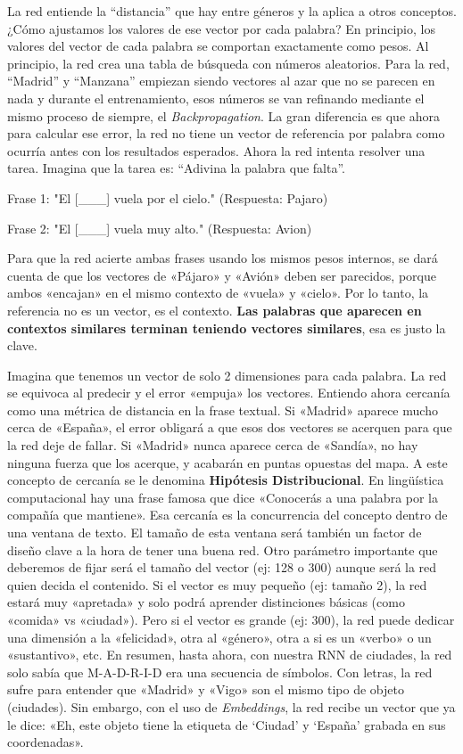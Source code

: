 \documentclass[a4paper,11pt]{article}
\begin{document}
La red entiende la ``distancia'' que hay entre géneros y la aplica a
otros conceptos. ¿Cómo ajustamos los valores de ese vector por cada
palabra? En principio, los valores del vector de cada palabra se
comportan exactamente como pesos. Al principio, la red crea una tabla de
búsqueda con números aleatorios. Para la red, ``Madrid'' y ``Manzana''
empiezan siendo vectores al azar que no se parecen en nada y durante el
entrenamiento, esos números se van refinando mediante el mismo proceso
de siempre, el \emph{Backpropagation}. La gran diferencia es que ahora
para calcular ese error, la red no tiene un vector de referencia por
palabra como ocurría antes con los resultados esperados. Ahora la red
intenta resolver una tarea. Imagina que la tarea es: ``Adivina la
palabra que falta''.

\begin{codigo}
    Frase 1: "El [___] vuela por el cielo." (Respuesta: Pajaro)

    Frase 2: "El [___] vuela muy alto." (Respuesta: Avion)
\end{codigo}

Para que la red acierte ambas frases usando los mismos pesos internos,
se dará cuenta de que los vectores de «Pájaro» y «Avión» deben ser
parecidos, porque ambos «encajan» en el mismo contexto de «vuela» y
«cielo». Por lo tanto, la referencia no es un vector, es el contexto.
\textbf{Las palabras que aparecen en contextos similares terminan
teniendo vectores similares}, esa es justo la clave.

Imagina que tenemos un vector de solo 2 dimensiones para cada palabra.  La red
se equivoca al predecir y el error «empuja» los vectores.  Entiendo ahora
cercanía como una métrica de distancia en la frase textual. Si «Madrid» aparece
mucho cerca de «España», el error obligará a que esos dos vectores se acerquen
para que la red deje de fallar. Si «Madrid» nunca aparece cerca de «Sandía», no
hay ninguna fuerza que los acerque, y acabarán en puntas opuestas del mapa. A
este concepto de cercanía se le denomina \textbf{Hipótesis Distribucional}. En
lingüística computacional hay una frase famosa que dice «Conocerás a una palabra
por la compañía que mantiene». Esa cercanía es la concurrencia del concepto
dentro de una ventana de texto. El tamaño de esta ventana será también un factor
de diseño clave a la hora de tener una buena red.  Otro parámetro importante que
deberemos de fijar será el tamaño del vector (ej: 128 o 300) aunque será la red
quien decida el contenido. Si el vector es muy pequeño (ej: tamaño 2), la red
estará muy «apretada» y solo podrá aprender distinciones básicas (como «comida»
vs «ciudad»).  Pero si el vector es grande (ej: 300), la red puede dedicar una
dimensión a la «felicidad», otra al «género», otra a si es un «verbo» o un
«sustantivo», etc. En resumen, hasta ahora, con nuestra RNN de ciudades, la red
solo sabía que M-A-D-R-I-D era una secuencia de símbolos. Con letras, la red
sufre para entender que «Madrid» y «Vigo» son el mismo tipo de objeto
(ciudades). Sin embargo, con el uso de \emph{Embeddings}, la red recibe un
vector que ya le dice: «Eh, este objeto tiene la etiqueta de `Ciudad' y `España'
grabada en sus coordenadas».
\end{document}

